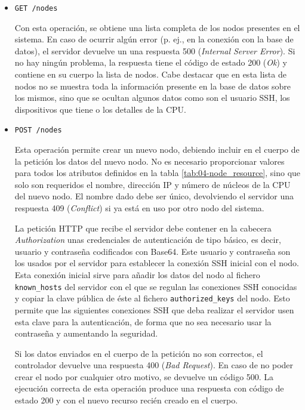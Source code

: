 \begin{itemize}
    \item \texttt{GET /nodes}

          Con esta operación, se obtiene una lista completa de los nodos
          presentes en el sistema. En caso de ocurrir algún error (p. ej., en la
          conexión con la base de datos), el servidor devuelve un una respuesta
          500 (\textit{Internal Server Error}). Si no hay ningún problema, la
          respuesta tiene el código de estado 200 (\textit{Ok}) y contiene en su
          cuerpo la lista de nodos. Cabe destacar que en esta lista de nodos no
          se muestra toda la información presente en la base de datos sobre los
          mismos, sino que se ocultan algunos datos como son el usuario SSH, los
          dispositivos que tiene o los detalles de la CPU.

    \item \texttt{POST /nodes}

          Esta operación permite crear un nuevo nodo, debiendo incluir en el
          cuerpo de la petición los datos del nuevo nodo. No es necesario
          proporcionar valores para todos los atributos definidos en la tabla
          \ref{tab:04-node_resource}, sino que solo son requeridos el nombre,
          dirección IP y número de núcleos de la CPU del nuevo nodo. El nombre
          dado debe ser único, devolviendo el servidor una respuesta 409
          (\textit{Conflict}) si ya está en uso por otro nodo del sistema.

          La petición HTTP que recibe el servidor debe contener en la cabecera
          \textit{Authorization} unas credenciales de autenticación de tipo
          básico, es decir, usuario y contraseña codificados con Base64. Este
          usuario y contraseña son los usados por el servidor para establecer la
          conexión SSH inicial con el nodo. Esta conexión inicial sirve para
          añadir los datos del nodo al fichero \texttt{known\_hosts} del
          servidor con el que se regulan las conexiones SSH conocidas y copiar
          la clave pública de éste al fichero \texttt{authorized\_keys} del
          nodo. Esto permite que las siguientes conexiones SSH que deba realizar
          el servidor usen esta clave para la autenticación, de forma que no sea
          necesario usar la contraseña y aumentando la seguridad.

          Si los datos enviados en el cuerpo de la petición no son correctos, el
          controlador devuelve una respuesta 400 (\textit{Bad Request}). En caso
          de no poder crear el nodo por cualquier otro motivo, se devuelve un
          código 500. La ejecución correcta de esta operación produce una
          respuesta con código de estado 200 y con el nuevo recurso recién
          creado en el cuerpo.


\end{itemize}
